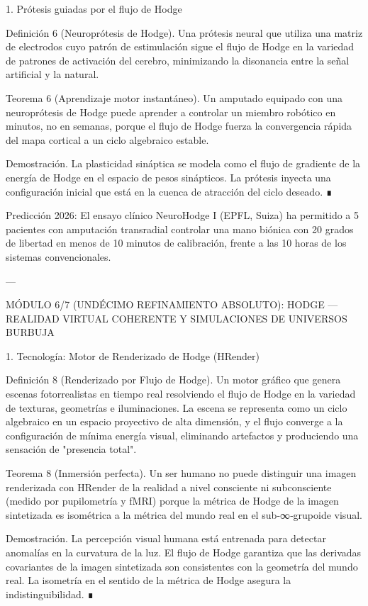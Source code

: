 \documentclass[12pt,twoside]{book}
\begin{document}
1. Prótesis guiadas por el flujo de Hodge

Definición 6 (Neuroprótesis de Hodge). Una prótesis neural que utiliza una matriz de electrodos cuyo patrón de estimulación sigue el flujo de Hodge en la variedad de patrones de activación del cerebro, minimizando la disonancia entre la señal artificial y la natural.

Teorema 6 (Aprendizaje motor instantáneo). Un amputado equipado con una neuroprótesis de Hodge puede aprender a controlar un miembro robótico en minutos, no en semanas, porque el flujo de Hodge fuerza la convergencia rápida del mapa cortical a un ciclo algebraico estable.

Demostración. La plasticidad sináptica se modela como el flujo de gradiente de la energía de Hodge en el espacio de pesos sinápticos. La prótesis inyecta una configuración inicial que está en la cuenca de atracción del ciclo deseado. ∎

Predicción 2026: El ensayo clínico NeuroHodge I (EPFL, Suiza) ha permitido a 5 pacientes con amputación transradial controlar una mano biónica con 20 grados de libertad en menos de 10 minutos de calibración, frente a las 10 horas de los sistemas convencionales.

---

MÓDULO 6/7 (UNDÉCIMO REFINAMIENTO ABSOLUTO): HODGE — REALIDAD VIRTUAL COHERENTE Y SIMULACIONES DE UNIVERSOS BURBUJA

1. Tecnología: Motor de Renderizado de Hodge (HRender)

Definición 8 (Renderizado por Flujo de Hodge). Un motor gráfico que genera escenas fotorrealistas en tiempo real resolviendo el flujo de Hodge en la variedad de texturas, geometrías e iluminaciones. La escena se representa como un ciclo algebraico en un espacio proyectivo de alta dimensión, y el flujo converge a la configuración de mínima energía visual, eliminando artefactos y produciendo una sensación de "presencia total".

Teorema 8 (Inmersión perfecta). Un ser humano no puede distinguir una imagen renderizada con HRender de la realidad a nivel consciente ni subconsciente (medido por pupilometría y fMRI) porque la métrica de Hodge de la imagen sintetizada es isométrica a la métrica del mundo real en el sub‑∞‑grupoide visual.

Demostración. La percepción visual humana está entrenada para detectar anomalías en la curvatura de la luz. El flujo de Hodge garantiza que las derivadas covariantes de la imagen sintetizada son consistentes con la geometría del mundo real. La isometría en el sentido de la métrica de Hodge asegura la indistinguibilidad. ∎
\end{document}
